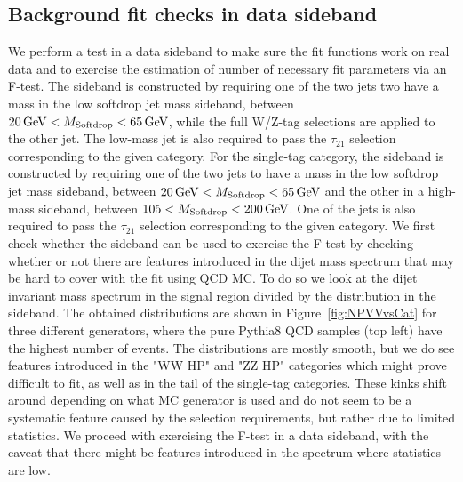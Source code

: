 \subsection{Background fit checks in data sideband}
\label{sec:app:2016bkgfit}
We perform a test in a data sideband to make sure the fit functions work on real data and to exercise the estimation of number of necessary fit parameters via an F-test.
The sideband is constructed by requiring one of the two jets two have a mass in the low softdrop jet mass sideband, between $20 \,\text{Ge\hspace{-.08em}V} < M_{\rm{Softdrop}} < 65 \,\text{Ge\hspace{-.08em}V}$, while the full W/Z-tag selections are applied to the other jet. The low-mass jet is also required to pass the $\tau_{21}$ selection corresponding to the given category. For the single-tag category, the sideband is constructed by requiring one of the two jets to have a mass in the low softdrop jet mass sideband, between $20 \,\text{Ge\hspace{-.08em}V} < M_{\rm{Softdrop}} < 65 \,\text{Ge\hspace{-.08em}V}$ and the other in a high-mass sideband, between $105 < M_{\rm{Softdrop}} < 200 \,\text{Ge\hspace{-.08em}V}$. One of the jets is also required to pass the $\tau_{21}$ selection corresponding to the given category.
We first check whether the sideband can be used to exercise the F-test by checking whether or not there are features introduced in the dijet mass spectrum that may be hard to cover with the fit using QCD MC. To do so we look at the dijet invariant mass spectrum in the signal region divided by the distribution in the sideband. The obtained distributions are shown in Figure~\ref{fig:NPVVvsCat} for three different generators, where the pure Pythia8 QCD samples (top left) have the highest number of events. The distributions are mostly smooth, but we do see features introduced in the "WW HP" and "ZZ HP" categories which might prove difficult to fit, as well as in the tail of the single-tag categories. These kinks shift around depending on what MC generator is used and do not seem to be a systematic feature caused by the selection requirements, but rather due to limited statistics. We proceed with exercising the F-test in a data sideband, with the caveat that there might be features introduced in the spectrum where statistics are low.

